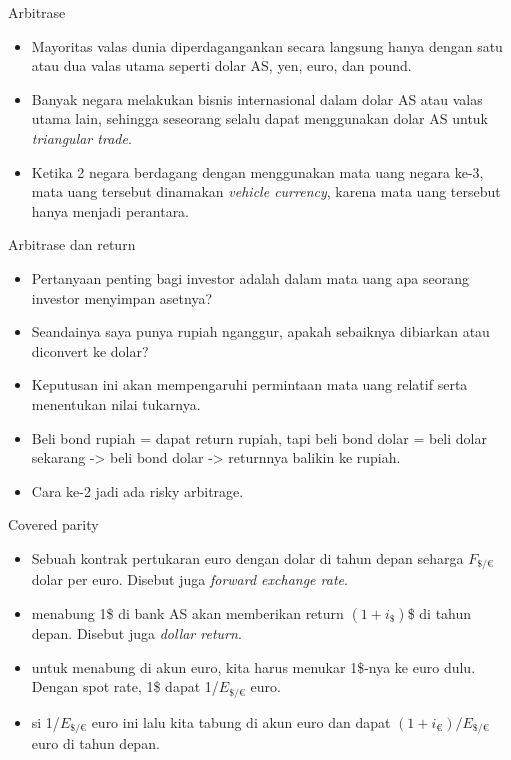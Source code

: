 \documentclass[
  ignorenonframetext,
]{beamer}
\begin{document}
\begin{frame}{Arbitrase}
\label{arbitrase-4}
\begin{itemize}
\item
  Mayoritas valas dunia diperdagangankan secara langsung hanya dengan
  satu atau dua valas utama seperti dolar AS, yen, euro, dan pound.
\item
  Banyak negara melakukan bisnis internasional dalam dolar AS atau valas
  utama lain, sehingga seseorang selalu dapat menggunakan dolar AS untuk
  \emph{triangular trade}.
\item
  Ketika 2 negara berdagang dengan menggunakan mata uang negara ke-3,
  mata uang tersebut dinamakan \emph{vehicle currency}, karena mata uang
  tersebut hanya menjadi perantara.
\end{itemize}
\end{frame}

\begin{frame}{Arbitrase dan return}
\label{arbitrase-dan-return}
\begin{itemize}
\item
  Pertanyaan penting bagi investor adalah dalam mata uang apa seorang
  investor menyimpan asetnya?
\item
  Seandainya saya punya rupiah nganggur, apakah sebaiknya dibiarkan atau
  diconvert ke dolar?
\item
  Keputusan ini akan mempengaruhi permintaan mata uang relatif serta
  menentukan nilai tukarnya.
\item
  Beli bond rupiah = dapat return rupiah, tapi beli bond dolar = beli
  dolar sekarang -\textgreater{} beli bond dolar -\textgreater{}
  returnnya balikin ke rupiah.
\item
  Cara ke-2 jadi ada risky arbitrage.
\end{itemize}
\end{frame}

\begin{frame}{Covered parity}
\label{covered-parity}
\begin{itemize}
\item
  Sebuah kontrak pertukaran euro dengan dolar di tahun depan seharga
  \(F_{\$/€}\) dolar per euro. Disebut juga \emph{forward exchange
  rate}.
\item
  menabung 1\$ di bank AS akan memberikan return \((1+i_{\$})\)\$ di
  tahun depan. Disebut juga \emph{dollar return}.
\item
  untuk menabung di akun euro, kita harus menukar 1\$-nya ke euro dulu.
  Dengan spot rate, 1\$ dapat 1/\(E_{\$/€}\) euro.
\item
  si 1/\(E_{\$/€}\) euro ini lalu kita tabung di akun euro dan dapat
  \((1+i_{€})/E_{\$/€}\) euro di tahun depan.
\end{itemize}
\end{frame}
\end{document}
